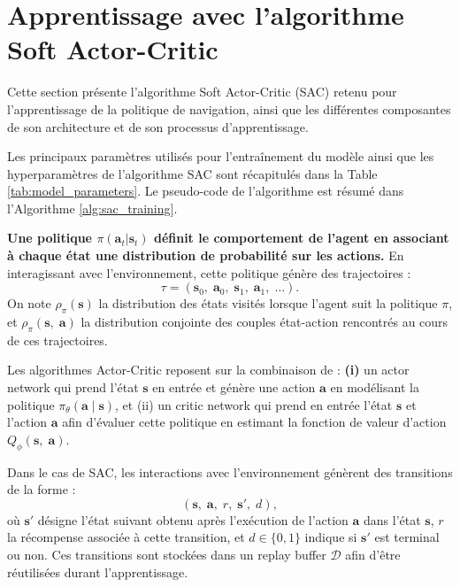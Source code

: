 \section{Apprentissage avec l'algorithme Soft Actor-Critic}

\begin{tcolorbox}[colback=black!5,colframe=black,title=]
    Cette section présente l'algorithme Soft Actor-Critic (SAC) retenu pour l'apprentissage de la politique de navigation, ainsi que les différentes composantes de son architecture et de son processus d'apprentissage.
\end{tcolorbox}

\noindent Les principaux paramètres utilisés pour l'entraînement du modèle ainsi que les hyperparamètres de l'algorithme SAC sont récapitulés dans la Table \ref{tab:model_parameters}. Le pseudo-code de l'algorithme est résumé dans l'Algorithme \ref{alg:sac_training}.

\vspace{10pt}

\noindent \textbf{Une politique $\pi(\mathbf{a}_t|\mathbf{s}_t)$ définit le comportement de l'agent en associant à chaque état une distribution de probabilité sur les actions.} En interagissant avec l'environnement, cette politique génère des trajectoires :
$$
    \tau = (\mathbf{s}_0, \; \mathbf{a}_0, \; \mathbf{s}_1, \; \mathbf{a}_1, \; \ldots).
$$
\noindent On note $\rho_\pi(\mathbf{s})$ la distribution des états visités lorsque l'agent suit la politique $\pi$, et $\rho_\pi(\mathbf{s}, \; \mathbf{a})$ la distribution conjointe des couples état-action rencontrés au cours de ces trajectoires.


\vspace{10pt}

\noindent Les algorithmes Actor-Critic reposent sur la combinaison de : \textbf{(i)} un actor network qui prend l'état $\mathbf{s}$ en entrée et génère une action $\mathbf{a}$ en modélisant la politique $\pi_\theta(\mathbf{a} \mid \mathbf{s})$, et (ii) un critic network qui prend en entrée l'état $\mathbf{s}$ et l'action $\mathbf{a}$ afin d'évaluer cette politique en estimant la fonction de valeur d'action $Q_\phi(\mathbf{s}, \; \mathbf{a})$.

\vspace{10pt}

\noindent Dans le cas de SAC, les interactions avec l'environnement génèrent des transitions de la forme :
$$
    (\mathbf{s}, \; \mathbf{a}, \; r, \; \mathbf{s}', \; d),
$$
où $\mathbf{s}'$ désigne l'état suivant obtenu après l'exécution de l'action $\mathbf{a}$ dans l'état $\mathbf{s}$, $r$ la récompense associée à cette transition, et $d \in \{0, 1\}$ indique si $\mathbf{s}'$ est terminal ou non. Ces transitions sont stockées dans un replay buffer $\mathcal{D}$ afin d'être réutilisées durant l'apprentissage.


